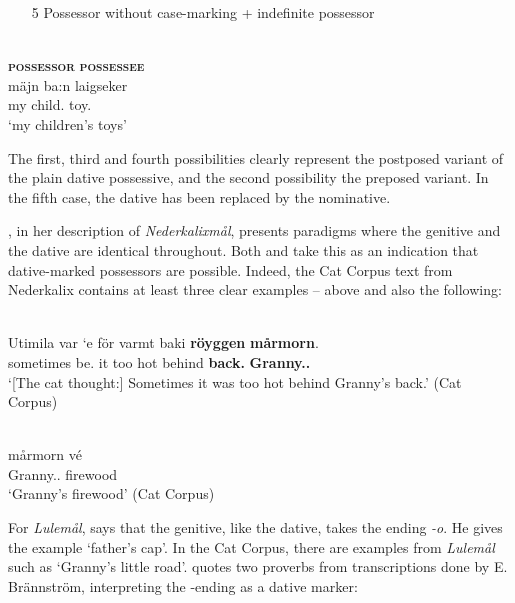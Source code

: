 \begin{enumerate}
\item[5] Possessor without case-marking + indefinite possessor
\end{enumerate}


\ea%
\\
\glll \textbf{\textsc{possessor}} \textbf{\textsc{possessee}}\\
mäjn  ba:n  laigseker\\
my  child.{\pl}  toy.{\pl}\\
\glt ‘my children’s toys’
\z

The first, third and fourth possibilities clearly represent the postposed variant of the plain dative possessive, and the second possibility the preposed variant. In the fifth case, the dative has been replaced by the nominative.  

\citet{Rutberg1924}, in her description of \textit{Nederkalixmål}, presents paradigms where the genitive and the dative are identical throughout. Both \citet[161]{Källskog1992} and \citet[42]{Delsing2003a} take this as an indication that dative-marked possessors are possible. Indeed, the Cat Corpus text from Nederkalix contains at least three clear examples –  above and also the following:

\renewcommand{\eachwordone}{\itshape} 
\renewcommand{\eachwordtwo}{\upshape}  

\ea%
\\
\gll Utimila  var  ‘e  för  varmt  baki  \textbf{röyggen} \textbf{mårmorn}.\\
sometimes  be.{\pst}  it  too  hot  behind  \textbf{back.{}} \textbf{Granny.{}.{\dat}}\\
\glt ‘[The cat thought:] Sometimes it was too hot behind Granny’s back.’ (Cat Corpus)
\z

\ea%
\\
\gll mårmorn  vé\\
Granny.{}.{\dat}  firewood\\
\glt ‘Granny’s firewood’  (Cat Corpus)
\z

For \textit{Lulemål}, \citet{Nordström1925} says that the genitive, like the dative, takes the ending\textit{ {}-o}. He gives the example  ‘father’s cap’. In the Cat Corpus, there are examples from \textit{Lulemål} such as  ‘Granny’s little road’.  \citet[163]{Källskog1992} quotes two proverbs from transcriptions done by E. Brännström, interpreting the -ending as a dative marker: 

